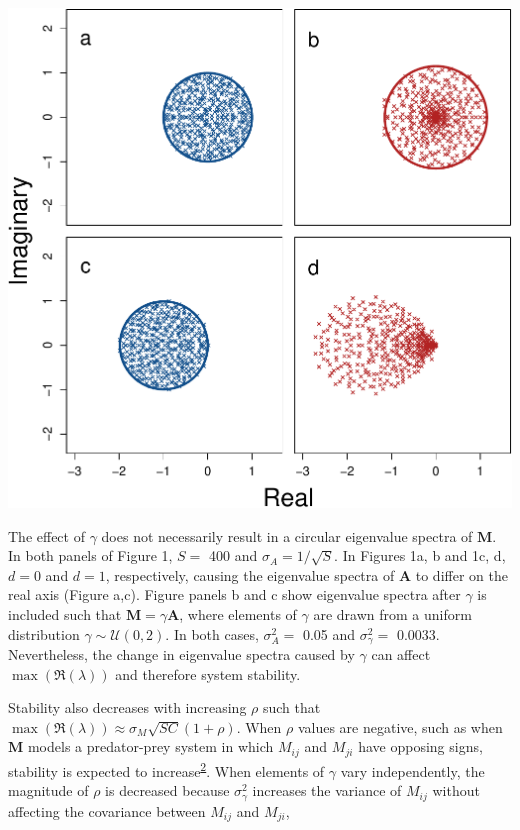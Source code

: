 \documentclass[]{article}
\begin{document}
\includegraphics{revision_notes_files/figure-latex/unnamed-chunk-2-1.pdf}

The effect of \(\gamma\) does not necessarily result in a circular
eigenvalue spectra of \(\textbf{M}\). In both panels of Figure 1,
\(S =\) 400 and \(\sigma_{A} = 1/\sqrt{S}\). In Figures 1a, b and 1c, d,
\(d = 0\) and \(d = 1\), respectively, causing the eigenvalue spectra of
\(\textbf{A}\) to differ on the real axis (Figure a,c). Figure panels b
and c show eigenvalue spectra after \(\gamma\) is included such that
\(\textbf{M} = \gamma \textbf{A}\), where elements of \(\gamma\) are
drawn from a uniform distribution \(\gamma \sim \mathcal{U}(0, 2)\). In
both cases, \(\sigma^{2}_{A} =\) 0.05 and \(\sigma^{2}_{\gamma} =\)
0.0033. Nevertheless, the change in eigenvalue spectra caused by
\(\gamma\) can affect \(\max(\Re(\lambda))\) and therefore system
stability.

Stability also decreases with increasing \(\rho\) such that
\(\max(\Re(\lambda)) \approx \sigma_{M}\sqrt{SC}\left(1 + \rho\right)\).
When \(\rho\) values are negative, such as when \(\textbf{M}\) models a
predator-prey system in which \(M_{ij}\) and \(M_{ji}\) have opposing
signs, stability is expected to
increase\textsuperscript{\protect\hyperlink{ref-Allesina2012}{2}}. When
elements of \(\gamma\) vary independently, the magnitude of \(\rho\) is
decreased because \(\sigma^{2}_{\gamma}\) increases the variance of
\(M_{ij}\) without affecting the covariance between \(M_{ij}\) and
\(M_{ji}\),
\end{document}
